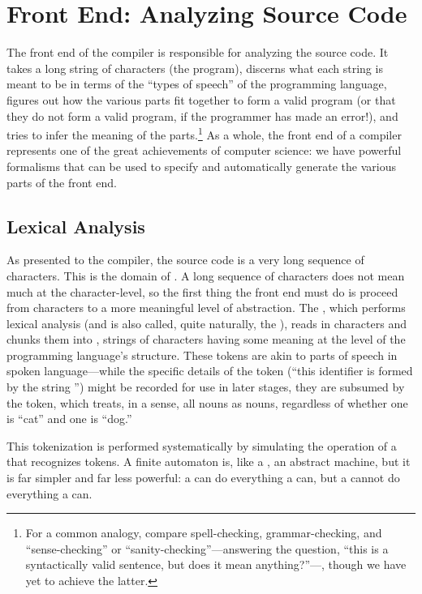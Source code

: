 \section{Front End: Analyzing Source Code}
The front end of the compiler is responsible for analyzing the source code. It takes a long string of characters (the program), discerns what each string is meant to be in terms of the ``types of speech'' of the programming language, figures out how the various parts fit together to form a valid program (or that they do not form a valid program, if the programmer has made an error!), and tries to infer the meaning of the parts.\footnote{For a common analogy, compare spell-checking, grammar-checking, and ``sense-checking'' or ``sanity-checking''---answering the question, ``this is a syntactically valid sentence, but does it mean anything?''---, though we have yet to achieve the latter.} As a whole, the front end of a compiler represents one of the great achievements of computer science: we have powerful formalisms that can be used to specify and automatically generate the various parts of the front end.

\subsection{Lexical Analysis}
As presented to the compiler, the source code is a very long sequence of characters. This is the domain of . A long sequence of characters does not mean much at the character-level, so the first thing the front end must do is proceed from characters to a more meaningful level of abstraction. The , which performs lexical analysis (and is also called, quite naturally, the ), reads in characters and chunks them into , strings of characters having some meaning at the level of the programming language's structure. These tokens are akin to parts of speech in spoken language---while the specific details of the token (``this identifier is formed by the string '') might be recorded for use in later stages, they are subsumed by the token, which treats, in a sense, all nouns as nouns, regardless of whether one is ``cat'' and one is ``dog.''

This tokenization is performed systematically by simulating the operation of a  that recognizes tokens. A finite automaton is, like a \TM, an abstract machine, but it is far simpler and far less powerful: a \TM can do everything a \FA can, but a \FA cannot do everything a \TM can.

